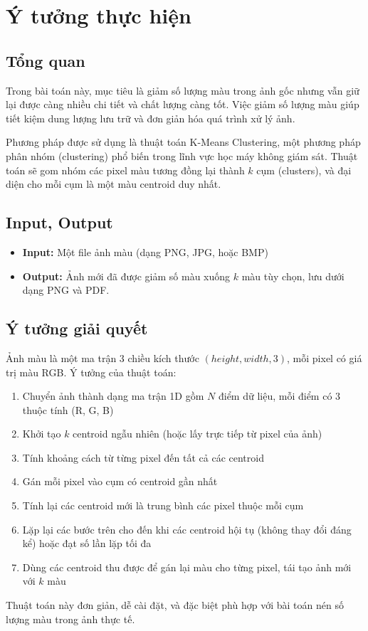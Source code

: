 \section{Ý tưởng thực hiện}

\subsection{Tổng quan}
Trong bài toán này, mục tiêu là giảm số lượng màu trong ảnh gốc nhưng vẫn giữ lại được càng nhiều chi tiết và chất lượng càng tốt. Việc giảm số lượng màu giúp tiết kiệm dung lượng lưu trữ và đơn giản hóa quá trình xử lý ảnh.

Phương pháp được sử dụng là thuật toán K-Means Clustering, một phương pháp phân nhóm (clustering) phổ biến trong lĩnh vực học máy không giám sát. Thuật toán sẽ gom nhóm các pixel màu tương đồng lại thành \(k\) cụm (clusters), và đại diện cho mỗi cụm là một màu centroid duy nhất.

\subsection{Input, Output}
\begin{itemize}
	\item \textbf{Input:} Một file ảnh màu (dạng PNG, JPG, hoặc BMP)
	\item \textbf{Output:} Ảnh mới đã được giảm số màu xuống \(k\) màu tùy chọn, lưu dưới dạng PNG và PDF.%
\end{itemize}

\subsection{Ý tưởng giải quyết}
Ảnh màu là một ma trận 3 chiều kích thước \((height, width, 3)\), mỗi pixel có giá trị màu RGB. Ý tưởng của thuật toán:
\begin{enumerate}
	\item Chuyển ảnh thành dạng ma trận 1D gồm \(N\) điểm dữ liệu, mỗi điểm có 3 thuộc tính (R, G, B)
	\item Khởi tạo \(k\) centroid ngẫu nhiên (hoặc lấy trực tiếp từ pixel của ảnh)
	\item Tính khoảng cách từ từng pixel đến tất cả các centroid
	\item Gán mỗi pixel vào cụm có centroid gần nhất
	\item Tính lại các centroid mới là trung bình các pixel thuộc mỗi cụm
	\item Lặp lại các bước trên cho đến khi các centroid hội tụ (không thay đổi đáng kể) hoặc đạt số lần lặp tối đa
	\item Dùng các centroid thu được để gán lại màu cho từng pixel, tái tạo ảnh mới với \(k\) màu
\end{enumerate}

Thuật toán này đơn giản, dễ cài đặt, và đặc biệt phù hợp với bài toán nén số lượng màu trong ảnh thực tế.


